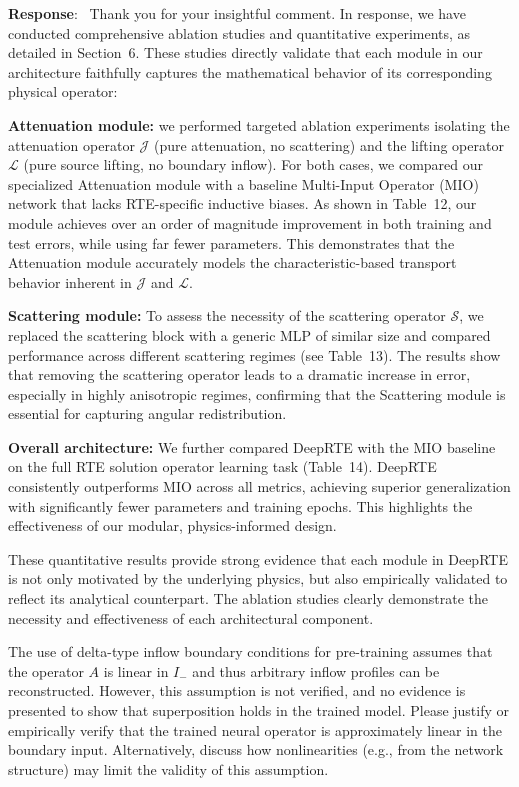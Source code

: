 \documentclass[12pt]{article}
\newcounter{reviewer}
\newcounter{point}[reviewer]
\renewcommand{\thepoint}{P\,\thereviewer.\arabic{point}}
\newenvironment{point}{\refstepcounter{point} \bigskip \noindent {\textbf{[Reviewer~Point~\thepoint]} }  }{\par }
\newenvironment{reply}{\medskip \noindent \textbf{Response}:\  \color{blue}\ignorespaces}{\medskip}
\begin{document}
\begin{reply}
	Thank you for your insightful comment.
	In response, we have conducted comprehensive ablation studies and quantitative experiments, as detailed in Section~6.
	These studies directly validate that each module in our architecture faithfully captures the mathematical behavior of its corresponding physical operator:

	\textbf{Attenuation module:} we performed targeted ablation experiments isolating the attenuation operator $\mathcal{J}$ (pure attenuation, no scattering) and the lifting operator $\mathcal{L}$ (pure source lifting, no boundary inflow). For both cases, we compared our specialized Attenuation module with a baseline Multi-Input Operator (MIO) network that lacks RTE-specific inductive biases. As shown in Table~12, our module achieves over an order of magnitude improvement in both training and test errors, while using far fewer parameters. This demonstrates that the Attenuation module accurately models the characteristic-based transport behavior inherent in $\mathcal{J}$ and $\mathcal{L}$.

	\textbf{Scattering module:} To assess the necessity of the scattering operator $\mathcal{S}$, we replaced the scattering block with a generic MLP of similar size and compared performance across different scattering regimes (see Table~13). The results show that removing the scattering operator leads to a dramatic increase in error, especially in highly anisotropic regimes, confirming that the Scattering module is essential for capturing angular redistribution.

	\textbf{Overall architecture:} We further compared DeepRTE with the MIO baseline on the full RTE solution operator learning task (Table~14). DeepRTE consistently outperforms MIO across all metrics, achieving superior generalization with significantly fewer parameters and training epochs. This highlights the effectiveness of our modular, physics-informed design.

	These quantitative results provide strong evidence that each module in DeepRTE is not only motivated by the underlying physics, but also empirically validated to reflect its analytical counterpart. The ablation studies clearly demonstrate the necessity and effectiveness of each architectural component.
\end{reply}

\begin{point}
	The use of delta-type inflow boundary conditions for pre-training assumes that the operator $A$ is linear in $I_{-}$ and thus arbitrary inflow profiles can be reconstructed. However, this assumption is not verified, and no evidence is presented to show that superposition holds in the trained model.
	Please justify or empirically verify that the trained neural operator is approximately linear in the boundary input. Alternatively, discuss how nonlinearities (e.g., from the network structure) may limit the validity of this assumption.
\end{point}
\end{document}
